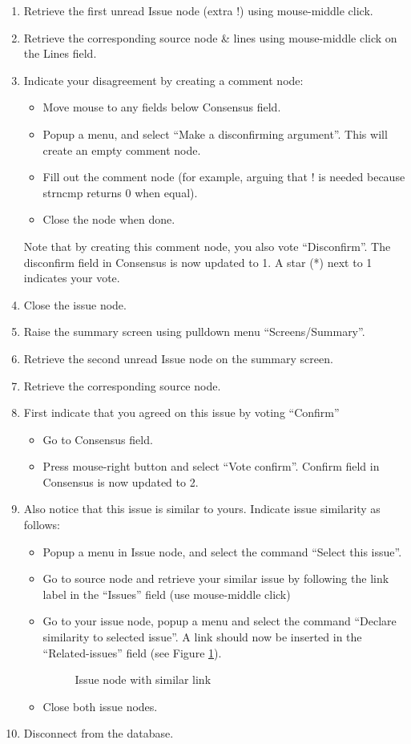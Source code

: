 \begin{enumerate}
\item Retrieve the first unread Issue node (extra !) using
mouse-middle click. 
\item Retrieve the corresponding source node \& lines using
mouse-middle click on the Lines field.
\item Indicate your disagreement by creating a comment node:
   \begin{itemize}
   \item Move mouse to any fields below Consensus field.
   \item Popup a menu, and select ``Make a disconfirming
   argument''. This will create an empty comment node.
   \item Fill out the comment node (for example, arguing that ! is
   needed because strncmp returns 0 when equal).
   \item Close the node when done. 
   \end{itemize}
  Note that by creating this comment node, you also vote
  ``Disconfirm''. The disconfirm field in Consensus is now updated to
  1. A star (*) next to 1 indicates your vote. 
\item Close the issue node.
\item Raise the summary screen using pulldown menu ``Screens/Summary''.
\item Retrieve the second unread Issue node on the summary screen.
\item Retrieve the corresponding source node.
\item First indicate that you agreed on this issue by voting
``Confirm''
  \begin{itemize}
    \item Go to Consensus field.
    \item Press mouse-right button and  select ``Vote
    confirm''. Confirm field in Consensus is now updated to 2. 
  \end{itemize} 
\item Also notice that this issue is similar to yours.
Indicate issue similarity as follows:
\begin {itemize}
  \item Popup a menu in Issue node, and select the command ``Select this
issue''. 
  \item Go to source node and retrieve your similar issue  by following
  the link label in the  ``Issues'' field (use mouse-middle click)
  \item Go to your issue node, popup a menu and select the command
    ``Declare similarity to selected issue''. A link should now be
    inserted in the ``Related-issues'' field (see Figure
    \ref{similar-issue}).
\begin{figure}[htb]
  {\centerline{}}
  \caption{Issue node with similar link}
  \label{similar-issue}
\end{figure}
 
  \item Close both issue nodes.
\end {itemize}
\item Disconnect from the database.
\end{enumerate}

